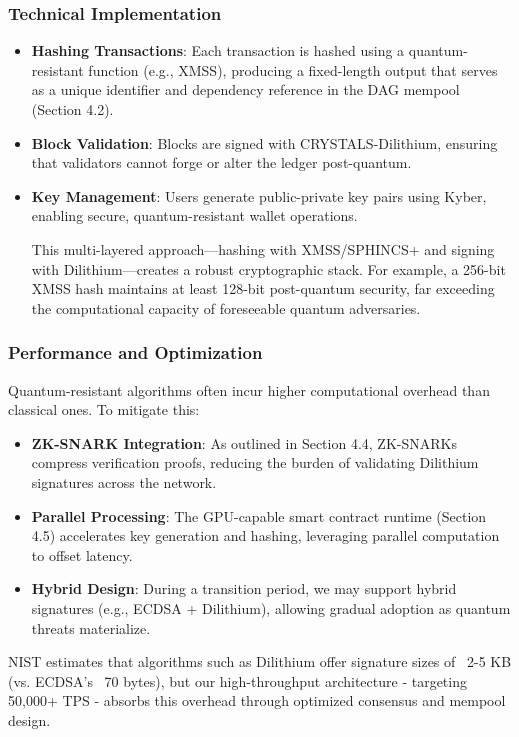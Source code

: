 \documentclass[12pt]{article}
\begin{document}
\subsubsection{Technical Implementation}
\begin{justify}
    \begin{itemize}
    \item \textbf{Hashing Transactions}: Each transaction is hashed using a quantum-resistant function (e.g., XMSS), producing a fixed-length output that serves as a unique identifier and dependency reference in the DAG mempool (Section 4.2).

    \item \textbf{Block Validation}: Blocks are signed with CRYSTALS-Dilithium, ensuring that validators cannot forge or alter the ledger post-quantum.

    \item \textbf{Key Management}: Users generate public-private key pairs using Kyber, enabling secure, quantum-resistant wallet operations.

    This multi-layered approach—hashing with XMSS/SPHINCS+ and signing with Dilithium—creates a robust cryptographic stack. For example, a 256-bit XMSS hash maintains at least 128-bit post-quantum security, far exceeding the computational capacity of foreseeable quantum adversaries.

\end{itemize}
\end{justify}

\subsubsection{Performance and Optimization}
\begin{justify}
    Quantum-resistant algorithms often incur higher computational overhead than classical ones. To mitigate this:
    \begin{itemize}
        \item \textbf{ZK-SNARK Integration}: As outlined in Section 4.4, ZK-SNARKs compress verification proofs, reducing the burden of validating Dilithium signatures across the network.

        \item \textbf{Parallel Processing}: The GPU-capable smart contract runtime (Section 4.5) accelerates key generation and hashing, leveraging parallel computation to offset latency.

        \item \textbf{Hybrid Design}: During a transition period, we may support hybrid signatures (e.g., ECDSA + Dilithium), allowing gradual adoption as quantum threats materialize.
        
    \end{itemize}
    
NIST estimates that algorithms such as Dilithium offer signature sizes of ~2-5 KB (vs. ECDSA’s ~70 bytes), but our high-throughput architecture - targeting 50,000+ TPS - absorbs this overhead through optimized consensus and mempool design.

\end{justify}
\end{document}
